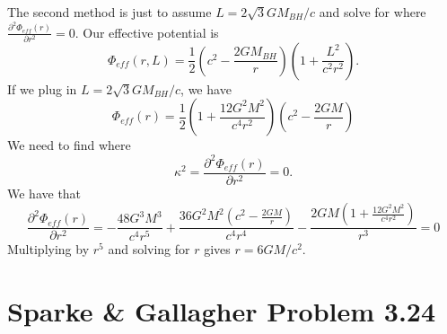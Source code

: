 \documentclass[]{article}
\begin{document}
The second method is just to assume $L = 2 \sqrt{3} G M_{BH}/c$ and solve for where $\frac{\partial^{2}\Phi_{eff}(r)}{\partial r^2} = 0$.
Our effective potential is
\begin{equation}
\Phi_{eff}(r,L) = \frac{1}{2}\left(c^2-\frac{2GM_{BH}}{r}\right)\left(1+ \frac{L^2}{c^2r^2}\right).
\end{equation}
\noindent
If we plug in $L=2\sqrt{3}GM_{BH}/c$, we have
\begin{equation}
\Phi_{eff}(r) = \frac{1}{2}\left(1+\frac{12G^2M^2}{c^4 r^2}\right)\left(c^2 - \frac{2GM}{r}\right)
\end{equation}
We need to find where
\begin{equation}
\kappa^2 = \frac{\partial^{2}\Phi_{eff}(r)}{\partial r^2} = 0.
\end{equation}
\noindent
We have that
\begin{equation}
\frac{\partial^{2}\Phi_{eff}(r)}{\partial r^2} = -\frac{48G^3 M^3}{c^4 r^5} + \frac{36 G^2 M^2 (c^2-\frac{2GM}{r})}{c^4 r^4} - \frac{2GM(1+\frac{12G^2M^2}{c^4r^2})}{r^3} = 0
\end{equation}
\noindent
Multiplying by $r^5$ and solving for $r$ gives $r = 6GM/c^2$.


\section{Sparke \& Gallagher Problem 3.24}
\end{document}
